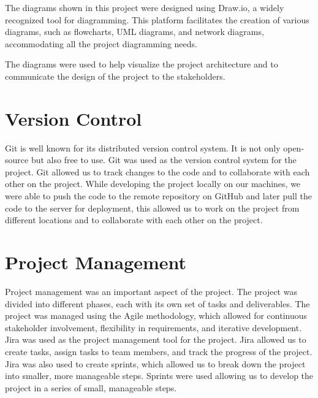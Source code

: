 The diagrams shown in this project were designed using Draw.io, a widely recognized tool for diagramming. This platform facilitates the creation of various 
diagrams, such as flowcharts, UML diagrams, and network diagrams, accommodating all the project diagramming needs.

The diagrams were used to help visualize the project architecture and to communicate the design of the
project to the stakeholders.

\section{Version Control}

Git is well known for its distributed version control system. It is not only open-source but also free to use.
Git was used as the version control system for the project. Git allowed us to track changes to the code and to collaborate with each other on the project.
While developing the project locally on our machines, we were able to push the code to the remote repository on GitHub and later pull the code to the server
for deployment, this allowed us to work on the project from different locations and to collaborate with each other on the project.

\section{Project Management}

Project management was an important aspect of the project. The project was divided into different phases, each with its own set of tasks and deliverables.
The project was managed using the Agile methodology, which allowed for continuous stakeholder involvement, flexibility in requirements, and iterative development.
Jira was used as the project management tool for the project. Jira allowed us to create tasks, assign tasks to team members, and track the progress of the project.
Jira was also used to create sprints, which allowed us to break down the project into smaller, more manageable steps. Sprints were used allowing us to develop the project 
in a series of small, manageable steps.
